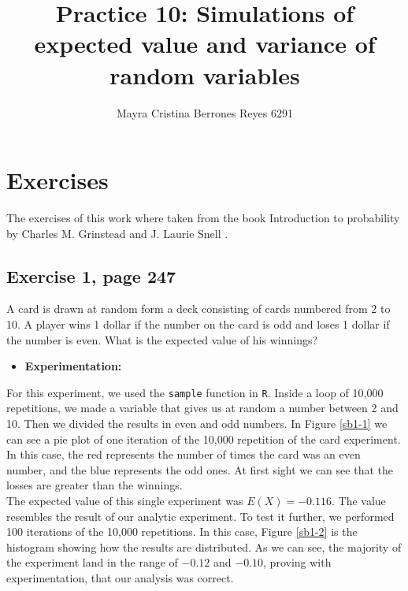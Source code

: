 \documentclass{article}
\begin{document}
\title{%
  Practice 10: Simulations of expected value and variance of random variables} %
\author{Mayra Cristina Berrones Reyes 6291}

\maketitle

\section{Exercises}

The exercises of this work where taken from the book Introduction to probability by Charles M. Grinstead and J. Laurie Snell \cite{grin}.

\subsection{Exercise 1, page 247}\label{ex1}

A card is drawn at random form a deck consisting of cards numbered from 2 to 10. A player wins 1 dollar if the number on the card is odd and loses 1 dollar if the number is even. What is the expected value of his winnings?\\

\begin{itemize}
\item \textbf{Experimentation:}
\end{itemize}

For this experiment, we used the \texttt{sample} function in \texttt{R}. Inside a loop of 10,000 repetitions, we made a variable that gives us at random a number between 2 and 10. Then we divided the results in even and odd numbers. In Figure \ref{sb1-1} we can see a pie plot of one iteration of the 10,000 repetition of the card experiment. In this case, the red represents the number of times the card was an even number, and the blue represents the odd ones. At first sight we can see that the losses are greater than the winnings. \\

The expected value of this single experiment was $E(X) = -0.116$. The value resembles the result of our analytic experiment. To test it further, we performed 100 iterations of the 10,000 repetitions. In this case, Figure \ref{sb1-2} is the histogram showing how the results are distributed. As we can see, the majority of the experiment land in the range of $-0.12$ and $-0.10$, proving with experimentation, that our analysis was correct.\\
\end{document}
